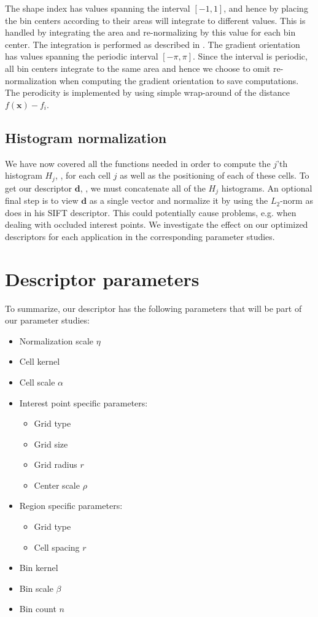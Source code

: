 \documentclass[thesis.tex]{subfiles}
\def\x{\mathbf{x}}
\def\d{\mathbf{d}}
\begin{document}
The shape index has values spanning the interval $[-1,1]$, and hence by placing the bin centers according to  their areas will integrate to different values. This is handled by integrating the area and re-normalizing by this value for each bin center. The integration is performed as described in . The gradient orientation has values spanning the periodic interval $[-\pi,\pi]$. Since the interval is periodic, all bin centers integrate to the same area and hence we choose to omit re-normalization when computing the gradient orientation to save computations. The perodicity is implemented by using simple wrap-around of the distance $f(\x) - f_i$.
%
\subsection{Histogram normalization}
%
We have now covered all the functions needed in order to compute the $j$'th histogram $H_j$, , for each cell $j$ as well as the positioning of each of these cells. To get our descriptor $\d$, , we must concatenate all of the $H_j$ histograms. An optional final step is to view $\d$ as a single vector and normalize it by using the $L_2$-norm as \citet{lowe2004distinctive} does in his SIFT descriptor. This could potentially cause problems, e.g. when dealing with occluded interest points. We investigate the effect on our optimized descriptors for each application in the corresponding parameter studies.
%
\section{Descriptor parameters}
\label{sec:descriptorParameters}
%
To summarize, our descriptor has the following parameters that will be part of our parameter studies:
%
\begin{itemize}
\itemsep0em
\item Normalization scale $\eta$
\item Cell kernel
\item Cell scale $\alpha$
\item Interest point specific parameters:
\begin{itemize}
\item Grid type
\item Grid size
\item Grid radius $r$ 
\item Center scale $\rho$
\end{itemize}
\item Region specific parameters:
\begin{itemize}
\item Grid type
\item Cell spacing $r$
\end{itemize}
\item Bin kernel
\item Bin scale $\beta$
\item Bin count $n$
\end{itemize}
%
\end{document}
